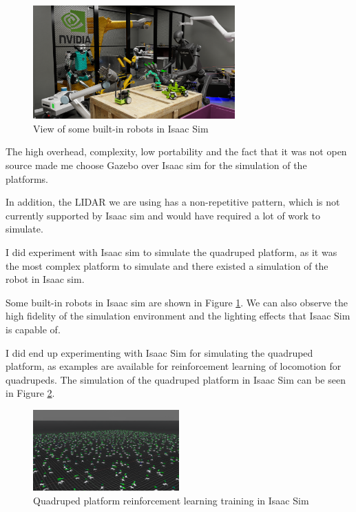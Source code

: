 \documentclass[12pt]{article}
\begin{document}
            \begin{figure}[H]
                \centering
                \includegraphics[width=0.69\textwidth]{Images/isaac_sim.png}
                \caption{View of some built-in robots in Isaac Sim}
                \label{fig:isaac_sim_robots}
            \end{figure}
            
            The high overhead, complexity, low portability and the fact that it was not open source made me choose Gazebo over Isaac sim for the simulation of the platforms.

            In addition, the LIDAR we are using has a non-repetitive pattern, which is not currently supported by Isaac sim and would have required a lot of work to simulate.

            I did experiment with Isaac sim to simulate the quadruped platform, as it was the most complex platform to simulate and there existed a simulation of the robot in Isaac sim.

            Some built-in robots in Isaac sim are shown in Figure \ref{fig:isaac_sim_robots}. We can also observe the high fidelity of the simulation environment and the lighting effects that Isaac Sim is capable of.

            I did end up experimenting with Isaac Sim for simulating the quadruped platform, as examples are available for reinforcement learning of locomotion for quadrupeds. The simulation of the quadruped platform in Isaac Sim can be seen in Figure \ref{fig:isaac_sim_quadruped}.



            \begin{figure}[H]
                \centering
                \includegraphics[width=0.5\textwidth]{Images/go2_rl_training.png}
                \caption{Quadruped platform reinforcement learning training in Isaac Sim}
                \label{fig:isaac_sim_quadruped}
            \end{figure}
\end{document}
